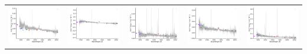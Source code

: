 \begin{center}
\begin{longtable}{l l l l l }
    \includegraphics[width=0.2\linewidth, clip]{Figs/Figs-sdss/spec-0673-52162-0547-STRIPE82-0140-024629.pdf} & \includegraphics[width=0.2\linewidth, clip]{Figs/Figs-sdss/spec-0674-52201-0135-SPLUS-s02s12-025538.pdf} & \includegraphics[width=0.2\linewidth, clip]{Figs/Figs-sdss/spec-0685-52203-0487-STRIPE82-0002-029499.pdf} & \includegraphics[width=0.2\linewidth, clip]{Figs/Figs-sdss/spec-0687-52518-0113-STRIPE82-0008-003185.pdf} & \includegraphics[width=0.2\linewidth, clip]{Figs/Figs-sdss/spec-0687-52518-0444-STRIPE82-0008-056238.pdf} \\

\end{longtable}
\end{center}
